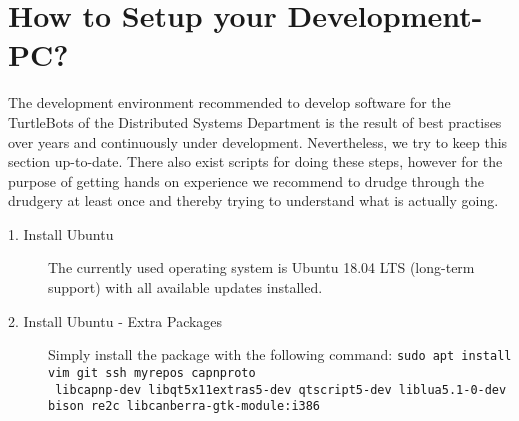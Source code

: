 \section{How to Setup your Development-PC?}
\label{sec:SetupPC}

The development environment recommended to develop software for the TurtleBots of the Distributed Systems Department is the result of best practises over years and continuously under development. Nevertheless, we try to keep this section up-to-date. There also exist scripts for doing these steps, however for the purpose of getting hands on experience we recommend to drudge through the drudgery at least once and thereby trying to understand what is actually going.

\begin{description}
	\item[1. Install Ubuntu] The currently used operating system is Ubuntu 18.04 LTS (long-term support) with all available updates installed.
	\item[2. Install Ubuntu - Extra Packages] Simply install the package with the following command: \verb#sudo apt install vim git ssh myrepos capnproto#\\\verb# libcapnp-dev libqt5x11extras5-dev qtscript5-dev liblua5.1-0-dev #\\\verb#bison re2c libcanberra-gtk-module:i386#
	

\end{description}
